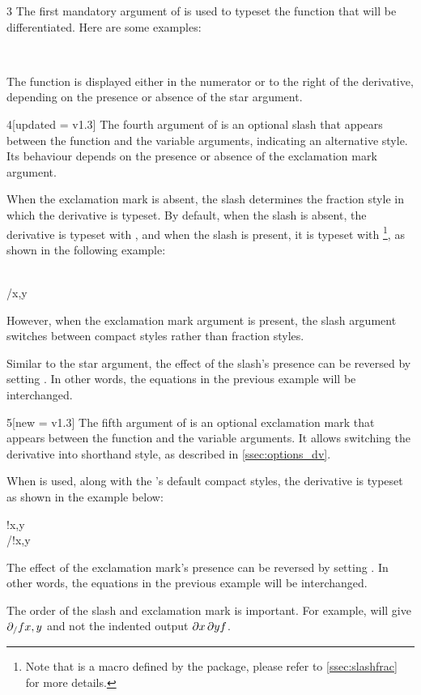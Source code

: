 \begin{function}
	\begin{argument}{3}
		The first mandatory argument of  is used to typeset the function that will be differentiated. Here are some examples:
		\begin{example}
			 \\
		\end{example}
		The function is displayed either in the numerator or to the right of the derivative, depending on the presence or absence of the star argument.
	\end{argument}
	
	\begin{argument}{4}[updated = v1.3]
		The fourth argument of  is an optional slash that appears between the function and the variable arguments, indicating an alternative style. Its behaviour depends on the presence or absence of the exclamation mark argument.
		
		When the exclamation mark is absent, the slash determines the fraction style in which the derivative is typeset. By default, when the slash is absent, the derivative is typeset with , and when the slash is present, it is typeset with \footnote{Note that  is a macro defined by the package, please refer to \cref{ssec:slashfrac} for more details.\label{foot:sfrac}}, as shown in the following example:
		\begin{example}
			\pdv{f}{x,y} \\
			\pdv{f}/{x,y}
		\end{example}
		However, when the exclamation mark argument is present, the slash argument switches between compact styles rather than fraction styles.
		
		Similar to the star argument, the effect of the slash's presence can be reversed by setting . In other words, the equations in the previous example will be interchanged.
	\end{argument}
	
	\begin{argument}{5}[new = v1.3]
		The fifth argument of  is an optional exclamation mark that appears between the function and the variable arguments. It allows switching the derivative into shorthand style, as described in \cref{ssec:options_dv}.
		
		When  is used, along with the 's default compact styles, the derivative is typeset as shown in the example below:
		\begin{example}
			!{x,y} \\
			\pdv{f}/!{x,y}
		\end{example}
		The effect of the exclamation mark's presence can be reversed by setting . In other words, the equations in the previous example will be interchanged.
		\begin{note}
			The order of the slash and exclamation mark is important. For example, \targ{!}\targ{/} will give $\pdv{f}!/{x,y}$ and not the indented output $\pdv{f}/!{x,y}$.
		\end{note}
	\end{argument}
	

\end{function}

